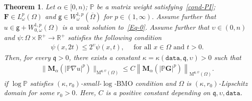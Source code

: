\documentclass[a4paper, 11pt]{article}
\newtheorem{theorem}{Theorem}[section]
\begin{document}
\begin{theorem}\label{theo:D}
Let $\alpha \in [0,n)$; $\mathbb{P}$ be a matrix weight satisfying~\eqref{cond-PI}; $\mathbf{F} \in L^{p}_{\omega}(\Omega)$ and $\mathsf{g} \in W^{1,p}_{\omega}(\overline{\Omega})$ for $p \in (1,\infty)$. Assume further that $u \in \mathsf{g} + W^{1,p}_{0,\omega}(\Omega)$ is a weak solution to~\eqref{Eq-0}. Assume further that $\upsilon \in (0,n)$ and $\psi: \Omega \times \mathbb{R}^+ \to \mathbb{R}^+$ satisfies the following condition 
\begin{align}\label{cond-psi-2}
\psi(x,2t) \le 2^{\upsilon} \psi(x,t), \quad \mbox{ for all } x \in \Omega \mbox{ and } t > 0.
\end{align}
Then, for every $\mathfrak{q}>0$, there exists a constant $\kappa = \kappa(\mathtt{data},\mathfrak{q},\upsilon)>0$ such that
\begin{align}\label{est:theo-D}
\|\mathbf{M}_{\alpha}(|\mathbb{P}\nabla u|^{p})\|_{\mathrm{M}^{\mathfrak{q},\psi}(\Omega)}  \le C \left\|\mathbf{M}_{\alpha}(|\mathbb{P}\mathbf{G}|^{p})\right\|_{\mathrm{M}^{\mathfrak{q},\psi}(\Omega)}.
\end{align}
 if $\log \mathbb{P}$ satisfies $(\kappa,r_0)$-small-$\log$-$\mathrm{BMO}$ condition and $\Omega$ is $(\kappa,r_0)$-Lipschitz domain for some $r_0>0$. Here, $C$ is a positive constant depending on $\mathfrak{q},\upsilon,\mathtt{data}$.
\end{theorem}
\end{document}
